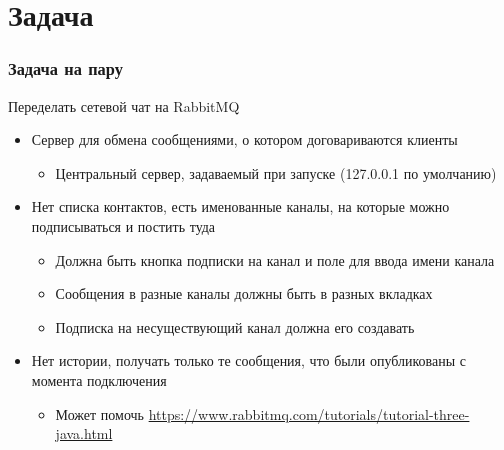 \documentclass[xetex,mathserif,serif]{beamer}
\begin{document}
	\section{Задача}

	\begin{frame}
		\frametitle{Задача на пару}
		Переделать сетевой чат на RabbitMQ
		\begin{itemize}
			\item Сервер для обмена сообщениями, о котором договариваются клиенты
			\begin{itemize}
				\item Центральный сервер, задаваемый при запуске (127.0.0.1 по умолчанию)
			\end{itemize}
			\item Нет списка контактов, есть именованные каналы, на которые можно подписываться и постить туда
			\begin{itemize}
				\item Должна быть кнопка подписки на канал и поле для ввода имени канала
				\item Сообщения в разные каналы должны быть в разных вкладках
				\item Подписка на несуществующий канал должна его создавать
			\end{itemize}
			\item Нет истории, получать только те сообщения, что были опубликованы с момента подключения
			\begin{itemize}
				\item Может помочь \url{https://www.rabbitmq.com/tutorials/tutorial-three-java.html}
			\end{itemize}
		\end{itemize}
	\end{frame}
\end{document}
